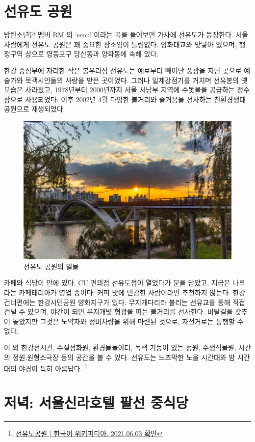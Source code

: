 \section{선유도 공원}
방탄소년단 멤버 RM 의 `seoul'이라는 곡을 들어보면 가사에 선유도가 등장한다. 서울
사람에게 선유도 공원은 꽤 중요한 장소임이 틀림없다. 양화대교와 맞닿아 있으며, 
행정구역 상으로 영등포구 당산동과 양화동에 속해 있다.

한강 중심부에 자리한 작은 봉우리섬 선유도는 예로부터 빼어난 풍광을 지닌 곳으로
예술가와 묵객시인들의 사랑을 받은 곳이었다. 그러나 일제강점기를 거치며 선유봉의 옛
모습은 사라졌고, 1978년부터 2000년까지 서울 서남부 지역에 수돗물을 공급하는 
정수장으로 사용되었다. 이후 2002년 4월 다양한 볼거리와 즐거움을 선사하는 
친환경생태공원으로 재생되었다.


\begin{figure}[ht]
    \centering
    \includegraphics[width=.6\textwidth]{e_img/ww_-006.jpg}
    \caption{선유도 공원의 일몰}
    \label{fig:haryu7}
\end{figure}

카페와 식당이 안에 있다. CU 편의점 선유도점이 열었다가 문을 닫았고, 지금은 
나루라는 카페테리아가 영업 중이다. 커피 맛에 민감한 사람이라면 추천하지 않는다. 한강 
건너편에는 한강시민공원 양화지구가 있다. 무지개다리라 불리는 선유교를 통해 직접 건널 수
있으며, 야간이 되면 무지개빛 형광을 띠는 볼거리를 선사한다. 비탈길을 갖추어 놓았지만
그것은 노약자와 정비차량을 위해 마련된 것으로, 자전거로는 통행할 수 없다.


이 외 한강전시관, 수질정화원, 환경물놀이터, 녹색 기둥이 있는 정원, 수생식물원,
시간의 정원,원형소극장 등의 공간을 볼 수 있다. 선유도는 느즈막한 노을 시간대와 밤 
시간대의 야경이 특히 아름답다.
\footnote{\href{https://ko.wikipedia.org/wiki/선유도공원}{선유도공원 $|$ 한국어 위키피디아. 2021.06.03 확인}}


\section{저녁: 서울신라호텔 팔선 중식당}



